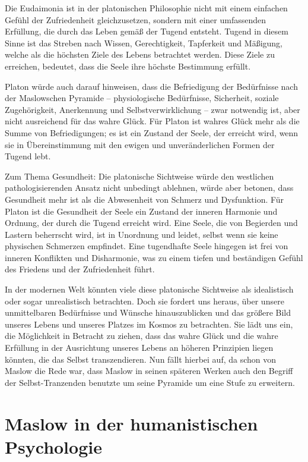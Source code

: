 \documentclass[12pt,a4paper]{article}
\begin{document}
Die Eudaimonia ist in der platonischen Philosophie nicht mit einem einfachen Gefühl der Zufriedenheit gleichzusetzen, sondern mit einer umfassenden Erfüllung, die durch das Leben gemäß der Tugend entsteht. Tugend in diesem Sinne ist das Streben nach Wissen, Gerechtigkeit, Tapferkeit und Mäßigung, welche als die höchsten Ziele des Lebens betrachtet werden. Diese Ziele zu erreichen, bedeutet, dass die Seele ihre höchste Bestimmung erfüllt.

Platon würde auch darauf hinweisen, dass die Befriedigung der Bedürfnisse nach der Maslowschen Pyramide – physiologische Bedürfnisse, Sicherheit, soziale Zugehörigkeit, Anerkennung und Selbstverwirklichung – zwar notwendig ist, aber nicht ausreichend für das wahre Glück. Für Platon ist wahres Glück mehr als die Summe von Befriedigungen; es ist ein Zustand der Seele, der erreicht wird, wenn sie in Übereinstimmung mit den ewigen und unveränderlichen Formen der Tugend lebt.

Zum Thema Gesundheit: Die platonische Sichtweise würde den westlichen pathologisierenden Ansatz nicht unbedingt ablehnen, würde aber betonen, dass Gesundheit mehr ist als die Abwesenheit von Schmerz und Dysfunktion. Für Platon ist die Gesundheit der Seele ein Zustand der inneren Harmonie und Ordnung, der durch die Tugend erreicht wird. Eine Seele, die von Begierden und Lastern beherrscht wird, ist in Unordnung und leidet, selbst wenn sie keine physischen Schmerzen empfindet. Eine tugendhafte Seele hingegen ist frei von inneren Konflikten und Disharmonie, was zu einem tiefen und beständigen Gefühl des Friedens und der Zufriedenheit führt.

In der modernen Welt könnten viele diese platonische Sichtweise als idealistisch oder sogar unrealistisch betrachten. Doch sie fordert uns heraus, über unsere unmittelbaren Bedürfnisse und Wünsche hinauszublicken und das größere Bild unseres Lebens und unseres Platzes im Kosmos zu betrachten. Sie lädt uns ein, die Möglichkeit in Betracht zu ziehen, dass das wahre Glück und die wahre Erfüllung in der Ausrichtung unseres Lebens an höheren Prinzipien liegen könnten, die das Selbst transzendieren. Nun fällt hierbei auf, da schon von Maslow die Rede war, dass Maslow in seinen späteren Werken auch den Begriff der Selbst-Tranzenden benutzte um seine Pyramide um eine Stufe zu erweitern.


\section{Maslow in der humanistischen Psychologie}
\end{document}
